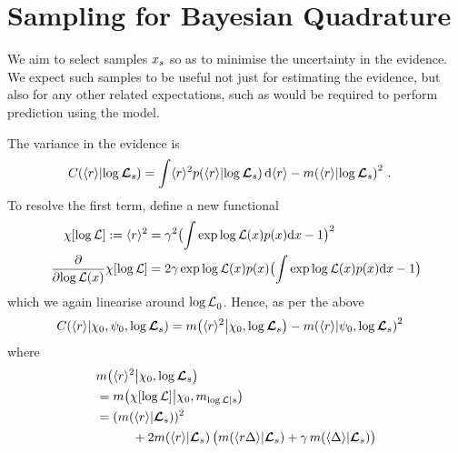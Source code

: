 \documentclass{article}
\begin{document}
\section{Sampling for Bayesian Quadrature}

We aim to select samples $\lfv_s$ so as to minimise the uncertainty in the evidence. We expect such samples to be useful not just for estimating the evidence, but also for any other related expectations, such as would be required to perform prediction using the model.

The variance in the evidence is
\begin{align*}
\cov{\langle r\rangle}{\tvr_{s}}
& = \int \inty{r}^2 \p{\inty{r}}{\tvr_s} \ud\inty{r}- \mean{\inty{r}}{\tvr_s}^2\,.
\end{align*}
To resolve the first term, define a new functional
\begin{align*}
 \chi[\tr] \deq \inty{r}^2 & = \gamma^2\bigl(\int  \exp \tr(\lfv) p(\lfv) \ud \lfv-1\bigr)^2\\
\pderiv{}{\tr(\lfv)}\chi[\tr] & = 2\gamma \exp \tr(\lfv) p(\lfv) \bigl(\int  \exp \tr(\lfv) p(\lfv) \ud \lfv-1\bigr)
\end{align*}
which we again linearise around $\tr_0$. Hence, as per the above
\begin{align*}
& \cov{\langle r\rangle}{\chi_0,\psi_0,\tvr_{s}} = \mean{\inty{r}^2}{\chi_0,\tvr_s} - \mean{\inty{r}}{\psi_0,\tvr_s}^2
\end{align*}
where
\begin{align*}
&\mean{\inty{r}^2}{\chi_0,\tvr_s} \\
& = \mean{\chi[\tr]}{\chi_0,m_{\tr|s}} \\
& = (\mean{\inty{r}}{\vr_s})^2 \\
& \hspace{1cm} + 2\mean{\inty{r}}{\vr_s}
\bigl(\mean{\inty{r \Delta}}{\vr_s} + \gamma\, \mean{\inty{\Delta}}{\vr_s}\bigr)
\end{align*}
\end{document}
